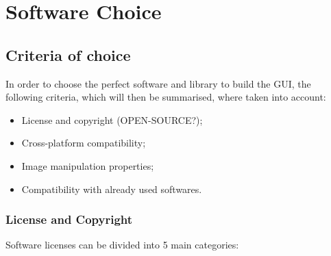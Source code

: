 

\chapter{Software Choice}
\label{cha:software_choice}



\section{Criteria of choice} 
\label{sub:criteria_of_choice}

In order to choose the perfect software and library to build the GUI, the following criteria, which will then be summarised, where taken into account:

\begin{itemize}
  \item License and copyright (OPEN-SOURCE?);
  \item Cross-platform compatibility;
  \item Image manipulation properties; %
  \item Compatibility with already used softwares. %
  
  
\end{itemize}

\subsection{License and Copyright}
\label{sub:license_and_copyright}

Software licenses can be divided into 5 main categories:

